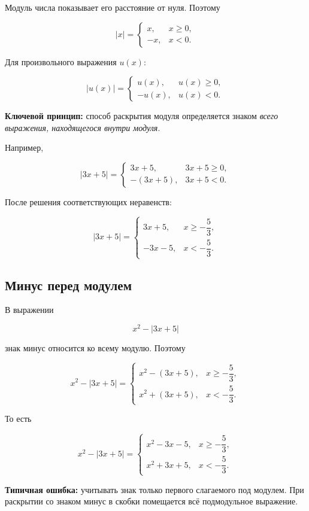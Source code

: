 \documentclass[a4paper,12pt]{article}
\newcommand{\key}[1]{\textcolor{darkaccent}{\textbf{#1}}}
\begin{document}
Модуль числа показывает его расстояние от нуля. Поэтому

\[
|x|=
\begin{cases}
x, & x\ge 0,\\
-x, & x<0.
\end{cases}
\]

Для произвольного выражения \(u(x)\):

\[
|u(x)|=
\begin{cases}
u(x), & u(x)\ge 0,\\
-u(x), & u(x)<0.
\end{cases}
\]

\key{Ключевой принцип:} способ раскрытия модуля определяется знаком
\emph{всего выражения, находящегося внутри модуля}.

Например,

\[
|3x+5|=
\begin{cases}
3x+5, & 3x+5\ge0,\\
-(3x+5), & 3x+5<0.
\end{cases}
\]

После решения соответствующих неравенств:

\[
|3x+5|=
\begin{cases}
3x+5, & x\ge-\dfrac53,\\[0.4em]
-3x-5, & x<-\dfrac53.
\end{cases}
\]

\subsection{Минус перед модулем}

В выражении

\[
x^2-|3x+5|
\]

знак минус относится ко всему модулю. Поэтому

\[
x^2-|3x+5|=
\begin{cases}
x^2-(3x+5), & x\ge-\dfrac53,\\[0.4em]
x^2+(3x+5), & x<-\dfrac53.
\end{cases}
\]

То есть

\[
x^2-|3x+5|=
\begin{cases}
x^2-3x-5, & x\ge-\dfrac53,\\
x^2+3x+5, & x<-\dfrac53.
\end{cases}
\]

\key{Типичная ошибка:}
учитывать знак только первого слагаемого под модулем.
При раскрытии со знаком минус в скобки помещается всё подмодульное выражение.
\end{document}
